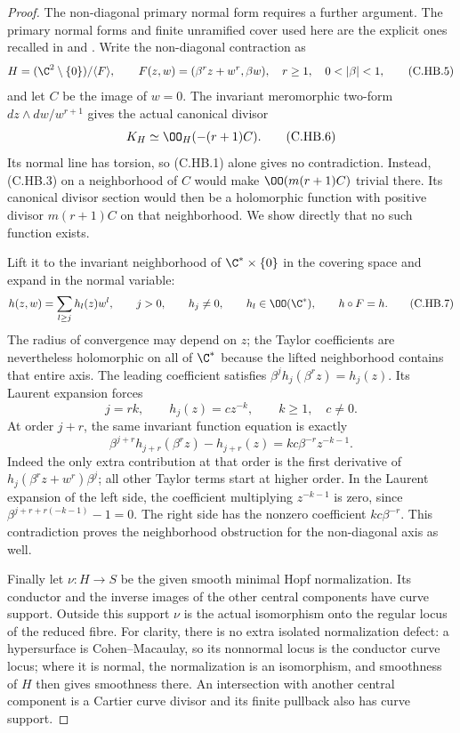 \begin{proof}
The non-diagonal primary normal form
requires a further argument. The primary
normal forms and finite unramified cover
used here are the explicit ones recalled
in \cite[Theorem~2.1]{Khaled2024Hopf}
and \cite[\S1.1]{Nakamura2008VII}.
Write the non-diagonal contraction
as
\[
 H=(\C^2\setminus\{0\})/\langle F\rangle,
 \qquad F(z,w)=(\beta^r z+w^r,\beta w),
                  \quad r\ge1,\quad0<|\beta|<1,
                                                               \tag{C.HB.5}
\]
and let $C$ be the image of $w=0$.
The invariant meromorphic two-form
$dz\wedge dw/w^{r+1}$ gives the actual
canonical divisor
\[
                         K_H\simeq\OO_H(-(r+1)C).
                                                               \tag{C.HB.6}
\]
Its normal line has torsion, so (C.HB.1)
alone gives no contradiction. Instead,
(C.HB.3) on a neighborhood of $C$ would
make $\OO(m(r+1)C)$ trivial there.
Its canonical divisor section would
then be a holomorphic function with
positive divisor $m(r+1)C$ on that
neighborhood. We show directly that
no such function exists.

Lift it to the invariant neighborhood
of $\C^*\times\{0\}$ in the covering
space and expand in the normal variable:
\[
 h(z,w)=\sum_{l\ge j}h_l(z)w^l,
       \qquad j>0,\qquad h_j\ne0,
       \qquad h_l\in\OO(\C^*),
       \qquad h\circ F=h.                           \tag{C.HB.7}
\]
The radius of convergence may depend
on $z$; the Taylor coefficients are
nevertheless holomorphic on all of
$\C^*$ because the lifted neighborhood
contains that entire axis. The leading
coefficient satisfies
$\beta^j h_j(\beta^r z)=h_j(z)$.
Its Laurent expansion forces
\[
                      j=rk,\qquad
                      h_j(z)=c z^{-k},
                      \qquad k\ge1,\quad c\ne0.
                                                               \tag{C.HB.8}
\]
At order $j+r$, the same invariant
function equation is exactly
\[
 \beta^{j+r}h_{j+r}(\beta^r z)-h_{j+r}(z)
                    =k c\beta^{-r}z^{-k-1}.          \tag{C.HB.9}
\]
Indeed the only extra contribution
at that order is the first derivative
of $h_j(\beta^r z+w^r)\beta^j$;
all other Taylor terms start at
higher order. In the Laurent
expansion of the left side, the
coefficient multiplying $z^{-k-1}$
is zero, since
$\beta^{j+r+r(-k-1)}-1=0$.
The right side has the nonzero
coefficient $k c\beta^{-r}$.
This contradiction proves the
neighborhood obstruction for
the non-diagonal axis as well.

Finally let $\nu:H\to S$ be the
given smooth minimal Hopf
normalization. Its conductor
and the inverse images of
the other central components
have curve support. Outside
this support $\nu$ is the
actual isomorphism onto the
regular locus of the reduced
fibre. For clarity, there
is no extra isolated
normalization defect: a
hypersurface is Cohen--Macaulay,
so its nonnormal locus is
the conductor curve locus;
where it is normal, the
normalization is an isomorphism,
and smoothness of $H$ then
gives smoothness there.
An intersection with another
central component is a
Cartier curve divisor and
its finite pullback also
has curve support.


\end{proof}
